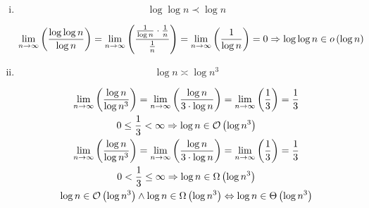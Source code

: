 \documentclass[a4paper]{scrartcl}
\begin{document}
\begin{enumerate}[(a)]
\begin{enumerate}[i.]
            \item
                \begin{equation*}
                    \log \log n \prec \log n
                \end{equation*}

                \begin{equation*}
                    \lim_{n \to \infty} \left( \frac{\log \log n}{\log n} \right)
                    = \lim_{n \to \infty} \left( \frac{\frac{1}{\log n} \cdot \frac{1}{n}}{\frac{1}{n}} \right)
                    = \lim_{n \to \infty} \left( \frac{1}{\log n} \right)
                    = 0 \Rightarrow \log \log n \in o \left( \log n \right)
                \end{equation*}

            \item
                \begin{equation*}
                    \log n \asymp \log n^3
                \end{equation*}

                \begin{equation*}
                    \begin{gathered}
                        \lim_{n \to \infty} \left( \frac{\log n}{\log n^3} \right)
                        = \lim_{n \to \infty} \left( \frac{\log n}{3 \cdot \log n} \right)
                        = \lim_{n \to \infty} \left( \frac{1}{3} \right)
                        = \frac{1}{3} \\
                        0 \leq \frac{1}{3} < \infty
                        \Rightarrow \log n \in \mathcal{O} \left( \log n^3 \right)
                        \\
                        \lim_{n \to \infty} \left( \frac{\log n}{\log n^3} \right)
                        = \lim_{n \to \infty} \left( \frac{\log n}{3 \cdot \log n} \right)
                        = \lim_{n \to \infty} \left( \frac{1}{3} \right)
                        = \frac{1}{3} \\
                        0 < \frac{1}{3} \leq \infty
                        \Rightarrow \log n \in \Omega \left( \log n^3 \right)
                        \\
                        \log n \in \mathcal{O} \left( \log n^3 \right)
                        \land
                        \log n \in \Omega \left( \log n^3 \right)
                        \Leftrightarrow
                        \log n \in \Theta \left( \log n^3 \right)
                    \end{gathered}
                \end{equation*}
            

\end{enumerate}
\end{enumerate}
\end{document}
